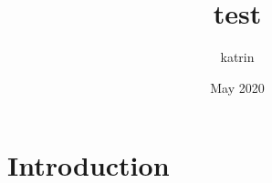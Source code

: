 \documentclass{article}
\title{test}
\author{katrin }
\date{May 2020}
\begin{document}
\maketitle

\section{Introduction}
\end{document}
